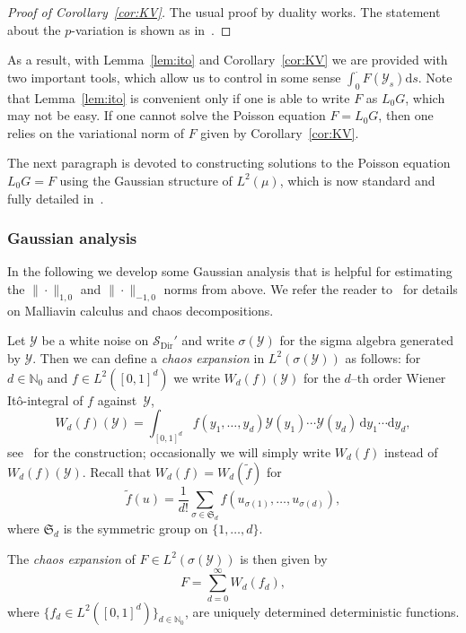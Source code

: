 \documentclass[AHL,Unicode,longabstracts]{cedram}
\DeclareMathOperator{\Dir}{Dir}
\newcommand{\bb}[1]{{\mathbb #1}}
\newcommand{\mc}[1]{{\mathcal #1}}
\renewcommand{\mc}[1]{{\mathcal #1}}
\newcommand{\SD}{\ensuremath{\mc S_{\Dir}}}
\newcommand*{\dd}{\mathrm{d}}
\newcommand*{\dy}{\dd y}
\newcommand*{\ds}{\dd s}
\begin{document}
\begin{proof}[Proof of Corollary~\ref{cor:KV}]
The usual proof by duality works. The statement about the $p$-variation is shown as in~\cite[Corollary~3]{Gubinelli2015Energy}.
\end{proof}

As a result, with Lemma~\ref{lem:ito} and Corollary~\ref{cor:KV} we are provided with two important tools, which allow us to control in some sense $\int_0^\cdot F(\mc Y_s)\ds$. Note that Lemma~\ref{lem:ito} is convenient only if one is able to write $F$ as $L_0G$, which may not be easy. If one cannot solve the Poisson equation $F=L_0G$, then one relies on the variational norm of $F$ given by Corollary~\ref{cor:KV}.

The next paragraph is devoted to constructing solutions to the Poisson equation $L_0G=F$ using the Gaussian structure of $L^2(\mu)$, which is now standard and fully detailed in~\cite[Section~3.2]{Gubinelli2015Energy}.

\subsubsection{Gaussian analysis}\label{ssec:gaussian}

In the following we develop some Gaussian analysis that is helpful for estimating the $\| \cdot \|_{1,0}$ and $\|\cdot \|_{-1,0}$ norms from above. We refer the reader to~\cite{Nualart2006, Janson1997} for details on Malliavin calculus and chaos decompositions.

Let $\mc Y$ be a white noise on $\SD'$ and write $\sigma(\mc Y)$ for the sigma algebra generated by $\mc Y$. Then we can define a \emph{chaos expansion} in $L^2(\sigma(\mc Y))$ as follows: for $d \in \bb N_0$ and $f \in L^2([0,1]^d)$ we write $W_d(f)(\mc Y)$ for the $d$--th order Wiener It\^o-integral of $f$ against~$\mc Y$,
\[
W_d(f)(\mc Y) = \int_{[0,1]^d} f(y_1, \dots, y_d) \mc Y(y_1) \cdots \mc Y(y_d) \, \dy_1 \cdots \dy_d,
\]
see~\cite[Section~1.1.2]{Nualart2006} for the construction; occasionally we will simply write $W_d(f)$ instead of $W_d(f)(\mc Y)$. Recall that $W_d(f) = W_d(\widetilde f)$ for
\[
\widetilde{f} (u) = \frac{1}{d!} \sum_{\sigma \in \mathfrak{S}_d} f (u_{\sigma (1)}, \ldots, u_{\sigma (d)}),
\]
where $\mathfrak{S}_d$ is the symmetric group on $\{1,\dots,d\}$.

The \emph{chaos expansion} of $F \in L^2(\sigma(\mc Y))$ is then given by
\[
F = \sum_{d=0}^\infty W_d(f_d),
\]
where $\{f_d \in L^2([0,1]^d)\}_{d \in \bb N_0}$, are uniquely determined deterministic functions.
\end{document}
